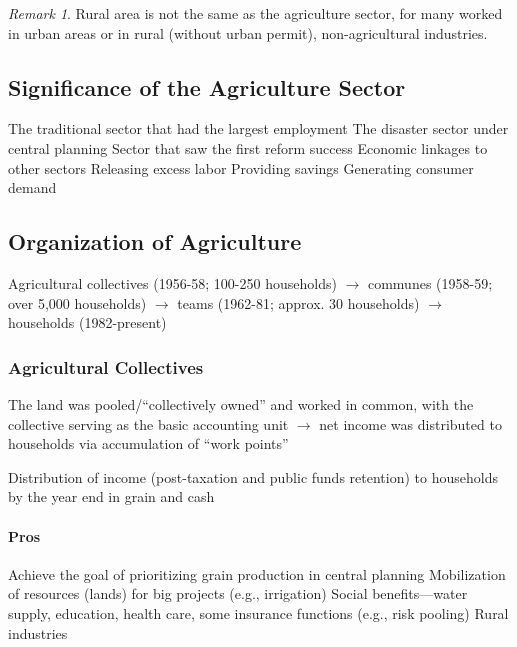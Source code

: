 \documentclass[11pt]{article}
\theoremstyle{definition}
\theoremstyle{remark}
\newtheorem*{remark}{Remark}
\begin{document}
\begin{remark}
Rural area is not the same as the agriculture sector, for many worked in urban areas or in rural (without urban permit), non-agricultural industries.
\end{remark}

\subsection{Significance of the Agriculture Sector}
\begin{outline}[enumerate]
\1 The traditional sector that had the largest employment
\1 The disaster sector under central planning
\1 Sector that saw the first reform success
\1 Economic linkages to other sectors
	\2 Releasing excess labor 
	\2 Providing savings 
	\2 Generating consumer demand
\end{outline}

\subsection{Organization of Agriculture}
Agricultural collectives (1956-58; 100-250 households) $\to$ communes (1958-59; over 5,000 households) $\to$ teams (1962-81; approx. 30 households) $\to$ households (1982-present)

\subsubsection{Agricultural Collectives}
The land was pooled/``collectively owned'' and worked in common, with the collective serving as the basic accounting unit $\to$ net income was distributed to households via accumulation of ``work points''
\begin{outline}[enumerate]
\1 Distribution of income (post-taxation and public funds retention) to households by the year end in grain and cash
\end{outline}

\paragraph{Pros}
\begin{outline}[enumerate]
\1 Achieve the goal of prioritizing grain production in central planning
\1 Mobilization of resources (lands) for big projects (e.g., irrigation)
\1 Social benefits---water supply, education, health care, some insurance functions (e.g., risk pooling)
\1 Rural industries
\end{outline}
\end{document}
